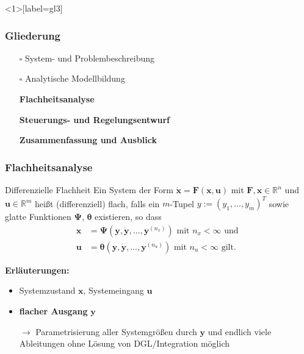 \documentclass[
	ngerman,
	10pt,				%
	aspectratio=169 	%
]{beamer}
\newcommand{\cdbox}{$\square$\hspace{-0.65em}\raisebox{0.1em}{\checkmark}\hspace{-0.18em}}
\begin{document}

\begin{frame}<1>[label=gl3]
	\frametitle{Gliederung}
	\begin{itemize}
		\item[\cdbox] System- und Problembeschreibung
		\item[\cdbox] Analytische Modellbildung
		\item[\only<1>{$\rightarrow$}\only<2>{$\rightarrow$}\only<3->{\cdbox}]
		\textbf<1>{Flachheitsanalyse}
		\item[\only<1-2>{$\square$}\only<3>{$\rightarrow$}\only<4->{\cdbox}]
		\textbf<2>{Steuerungs- und Regelungsentwurf}
		\item[\only<1-2>{$\square$}\only<3>{$\rightarrow$}\only<4->{\cdbox}]
		\textbf<3>{Zusammenfassung und Ausblick}
	\end{itemize}
\end{frame}


\begin{frame}[label=Flachheit_1]
	\frametitle{Flachheitsanalyse}
   	\begin{block}{Differenzielle Flachheit}
	Ein System der Form $\dot{\mathbf{x}} = \mathbf{F}(\mathbf{x}, \mathbf{u})$ mit $\mathbf{F}, \mathbf{x} \in \mathbb{R}^n$ und $\mathbf{u} \in \mathbb{R}^m$ heißt (differenziell) flach, falls ein $m$-Tupel $y := (y_1, ..., y_m)^T$ sowie glatte Funktionen $\mathbf{\Psi}$, $\boldsymbol{\theta}$ existieren, so dass
	\begin{align*}
			\mathbf{x} &= \mathbf{\Psi}(\mathbf{y}, \dot{\mathbf{y}}, ..., \mathbf{y}^{(n_x)}) \text{ mit } n_x < \infty \text{ und } \\
			\mathbf{u} &= \boldsymbol{\theta}(\mathbf{y}, \dot{\mathbf{y}}, ..., \mathbf{y}^{(n_u)}) \text{ mit } n_u < \infty \text{ gilt.}
	\end{align*}
	\end{block}

	\pause
	\bigskip
	\textbf{Erläuterungen:}
	\begin{itemize}
		\item Systemzustand $\mathbf{x}$, Systemeingang $\mathbf{u}$ 
		\item \textbf{flacher Ausgang} $\mathbf{y}$
		\item[$\rightarrow$] Parametrisierung aller Systemgrößen durch $\mathbf{y}$ und endlich viele Ableitungen ohne Lösung von DGL/Integration möglich
	\end{itemize}
\end{frame}
\end{document}
